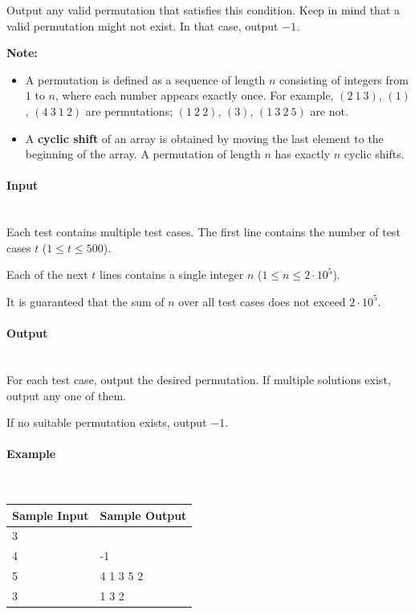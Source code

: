 \documentclass{article}
\begin{document}
Output any valid permutation that satisfies this condition. Keep in mind that a valid permutation might not exist. In that case, output $-1$.

\bigskip

\noindent
\textbf{Note:}
\begin{itemize}[leftmargin=1.5em]
    \item A permutation is defined as a sequence of length $n$ consisting of integers from $1$ to $n$, where each number appears exactly once. 
    For example, $(2\ 1\ 3)$, $(1)$, $(4\ 3\ 1\ 2)$ are permutations; $(1\ 2\ 2)$, $(3)$, $(1\ 3\ 2\ 5)$ are not.
    \item A \textbf{cyclic shift} of an array is obtained by moving the last element to the beginning of the array.
    A permutation of length $n$ has exactly $n$ cyclic shifts.
\end{itemize}

\paragraph{Input} \mbox{} \\

Each test contains multiple test cases. The first line contains the number of test cases $t$ ($1 \le t \le 500$).

Each of the next $t$ lines contains a single integer $n$ ($1 \le n \le 2 \cdot 10^5$).

It is guaranteed that the sum of $n$ over all test cases does not exceed $2 \cdot 10^5$.


\paragraph{Output}\mbox{} \\

For each test case, output the desired permutation. If multiple solutions exist, output any one of them.

If no suitable permutation exists, output $-1$.

\paragraph{Example}\mbox{} \\

\begin{table}[h]
    \centering
    \begin{tabular}{|l|l|}
        \hline
        \rowcolor{gray!30}
        \textbf{Sample Input} & \textbf{Sample Output} \\
        \hline
        3 & \\
        4 & -1 \\
        5 & 4 1 3 5 2 \\
        3 & 1 3 2 \\
        \hline
    \end{tabular}
\end{table}
\end{document}
